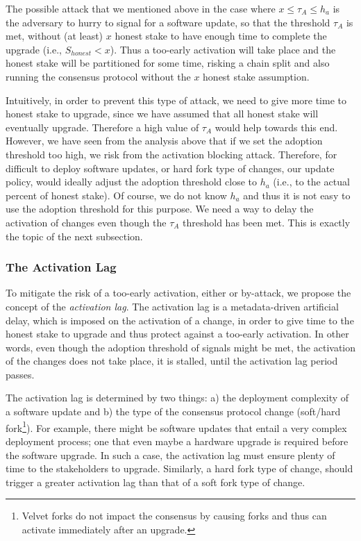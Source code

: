 The possible attack that we mentioned above in the case where $x \leq \tau_A \leq h_a$ is the adversary to hurry to signal for a software update, so that the threshold $\tau_A$ is met, without (at least) $x$ honest stake to have enough time to complete the upgrade (i.e., $S_{honest} < x$). Thus a too-early activation will take place and the honest stake will be partitioned for some time, risking a chain split and also running the consensus protocol without the $x$ honest stake assumption.

Intuitively, in order to prevent this type of attack, we need to give more time to honest stake to upgrade, since we have assumed that all honest stake will eventually upgrade. Therefore a high value of $\tau_A$ would help towards this end. However, we have seen from the analysis above that if we set the adoption threshold too high, we risk from the activation blocking attack. Therefore, for difficult to deploy software updates, or hard fork type of changes, our update policy, would ideally adjust the adoption threshold close to $h_a$ (i.e., to the actual percent of honest stake). Of course, we do not know $h_a$ and thus it is not easy to use the adoption threshold for this purpose. We need a way to delay the activation of changes even though the $\tau_A$ threshold has been met. This is exactly the topic of the next subsection.

\subsubsection{The Activation Lag}
To mitigate the risk of a too-early activation, either  or by-attack, we propose the concept of the \emph{activation lag}. The activation lag is a metadata-driven artificial delay, which is imposed on the activation of a change, in order to give time to the honest stake to upgrade and thus protect against a too-early activation. In other words, even though  the adoption threshold of signals might be met, the activation of the changes does not take place, it is stalled, until the activation lag period passes.

The activation lag is determined by two things: a) the deployment complexity of a software update and b) the type of the consensus protocol change (soft/hard fork\footnote{Velvet forks \cite{velvet} do not impact the consensus by causing forks and thus can activate immediately after an upgrade.}).
For example, there might be software updates that entail a very complex deployment process; one that even maybe a hardware upgrade is required before the software upgrade. In such a case, the activation lag must ensure plenty of time to the stakeholders to upgrade. Similarly, a hard fork type of change, should trigger a greater activation lag than that of a soft fork type of change. 

